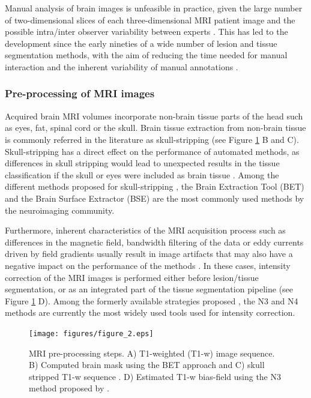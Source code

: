 Manual analysis of brain images is unfeasible in practice, given the large number of two-dimensional slices of each three-dimensional MRI patient image and the possible intra/inter observer variability between experts \cite{Cabezas2011}. This has led to the development since the early nineties of a wide number of lesion and tissue segmentation methods, with the aim of reducing the time needed for  manual interaction and the inherent variability of manual annotations \cite{Cline1990, Gerig1992, Kapur1996}. 


\subsubsection{Pre-processing of MRI images}
Acquired brain MRI volumes incorporate non-brain tissue parts of the head such as eyes, fat, spinal cord or the skull. Brain tissue extraction from non-brain tissue is commonly referred in the literature as skull-stripping (see Figure \ref{preprocessing_mri} B and C). Skull-stripping has a direct effect on the performance of automated methods, as differences in skull stripping would lead to unexpected results in the tissue classification if the skull or eyes were included as brain tissue \cite{Acosta-Cabronero2008, Popescu2012}. Among the different methods proposed for skull-stripping \cite{Acosta-Cabronero2008, Lee2003, Roura2014}, the Brain Extraction Tool (BET) \cite{Smith2002} and the Brain Surface Extractor (BSE) \cite{Shattuck2001} are the most commonly used methods by the neuroimaging community.

Furthermore, inherent characteristics of the MRI acquisition process such as differences in the magnetic field, bandwidth filtering of the data or eddy currents driven by field gradients usually result in image artifacts that may also have a negative impact on the performance of the methods \cite{Simmons1994}. In these cases, intensity correction of the MRI images is performed either before lesion/tissue segmentation, or as an integrated part of the tissue segmentation pipeline  (see Figure \ref{preprocessing_mri} D). Among the formerly available strategies proposed \cite{Arnold2001,Hou2006}, the N3 \cite{Sled1998} and N4 \cite{Tustison2010} methods are currently the most widely used tools used for intensity correction. 


\begin{figure}[top]
  \begin{center}
    \texttt{[image: figures/figure\_2.eps]}
  \end{center}
    \caption[MRI pre-processing steps]{MRI pre-processing steps. A) T1-weighted (T1-w) image sequence. B) Computed brain mask using the BET approach \cite{Smith2002} and C) skull stripped T1-w sequence  . D) Estimated T1-w bias-field using the N3 method proposed by \cite{Sled1998}.}
    \label{preprocessing_mri}
\end{figure}

